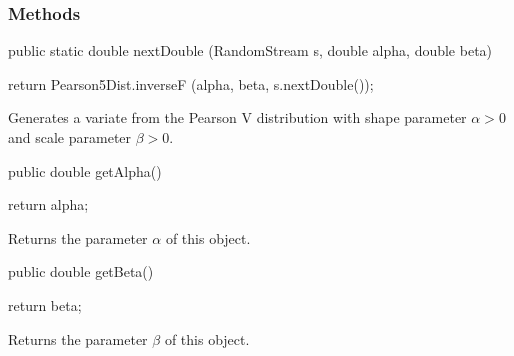 \subsubsection* {Methods}
\begin{code}

   public static double nextDouble (RandomStream s,
                                    double alpha, double beta)\begin{hide} {
      return Pearson5Dist.inverseF (alpha, beta, s.nextDouble());
   }\end{hide}
\end{code}
\begin{tabb} Generates a variate from the Pearson V distribution
   with shape parameter $\alpha > 0$ and scale parameter $\beta > 0$.
\end{tabb}
\begin{code}

   public double getAlpha()\begin{hide} {
      return alpha;
   }\end{hide}
\end{code}
\begin{tabb} Returns the parameter $\alpha$ of this object.
\end{tabb}
\begin{code}

   public double getBeta()\begin{hide} {
      return beta;
   }\end{hide}
\end{code}
\begin{tabb} Returns the parameter $\beta$ of this object.
\end{tabb}
\begin{code}\begin{hide}

   protected void setParams (double alpha, double beta) {
      if (alpha <= 0.0)
         throw new IllegalArgumentException ("alpha <= 0");
      if (beta <= 0.0)
         throw new IllegalArgumentException ("beta <= 0");
      this.alpha = alpha;
      this.beta = beta;
   }
}\end{hide}
\end{code}
